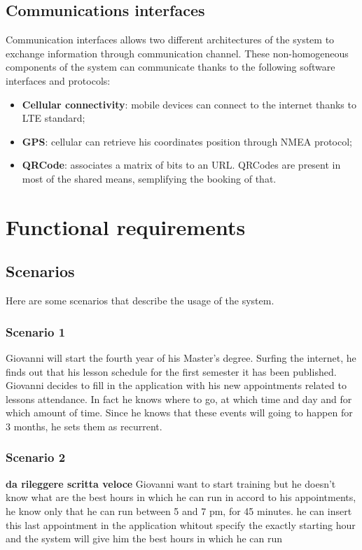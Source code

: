 \subsection{Communications interfaces}
Communication interfaces allows two different architectures of the system to exchange information through communication channel. These non-homogeneous components of the system can communicate thanks to the following software interfaces and protocols:
\begin{itemize}
\item \textbf{Cellular connectivity}: mobile devices can connect to the internet thanks to LTE standard;
\item \textbf{GPS}: cellular can retrieve his coordinates position through NMEA protocol;
\item \textbf{QRCode}: associates a matrix of bits to an URL. QRCodes are present in most of the shared means, semplifying the booking of that.
\end{itemize}


\section{Functional requirements}
\subsection{Scenarios}

Here are some scenarios that describe the usage of the system.

\subsubsection{Scenario 1} \label{scenario:1}
Giovanni will start the fourth year of his Master's degree. Surfing the internet, he finds out that his lesson schedule for the first semester it has been published. Giovanni decides to fill in the application with his new appointments related to lessons attendance. In fact he knows where to go, at which time and day and for which amount of time. Since he knows that these events will going to happen for 3 months, he sets them as recurrent.

\subsubsection{Scenario 2} \label{scenario:2}
\textbf{da rileggere scritta veloce}
Giovanni want to start training but he doesn't know what are the best hours in which he can run in accord to his appointments, he know only that he can run between 5 and 7 pm, for 45 minutes. he can insert this last appointment in the application whitout specify the exactly starting hour and the system will give him the best hours in which he can run

